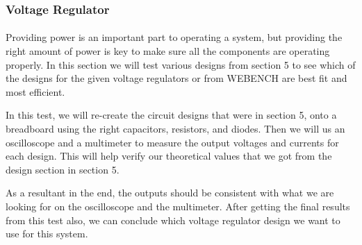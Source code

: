 \subsubsection{Voltage Regulator}
\paragraph{}Providing power is an important part to operating a system, but providing the right amount of power is key to make sure all the components are operating properly. In this section we will test various designs from section 5 to see which of the designs for the given voltage regulators or from WEBENCH are best fit and most efficient. \par 
In this test, we will re-create the circuit designs that were in section 5, onto a breadboard using the right capacitors, resistors, and diodes. Then we will us an oscilloscope and a multimeter to measure the output voltages and currents for each design. This will help verify our theoretical values that we got from the design section in section 5. \par
As a resultant in the end, the outputs should be consistent with what we are looking for on the oscilloscope and the multimeter. After getting the final results from this test also, we can conclude which voltage regulator design we want to use for this system.\par